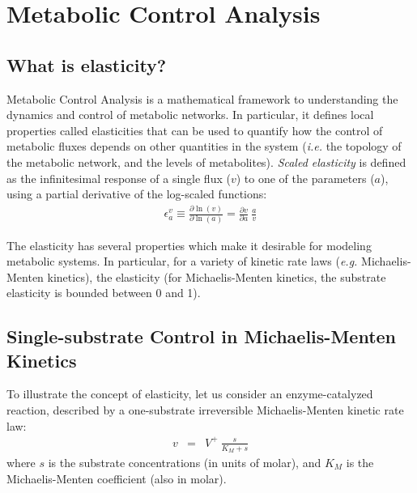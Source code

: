 \documentclass[12pt,a4paper]{article}
\begin{document}
\section{Metabolic Control Analysis}
\subsection{What is elasticity?}
Metabolic Control Analysis \cite{Fell1996-be} is a mathematical framework to understanding the dynamics and control of metabolic networks. In particular, it defines local properties called elasticities that can be used to quantify how the control of metabolic fluxes depends on other quantities in the system (\textit{i.e.} the topology of the metabolic network, and the levels of metabolites). \emph{Scaled elasticity} is defined as the infinitesimal response of a single flux ($v$) to one of the parameters ($a$), using a partial derivative of the log-scaled functions:
\begin{eqnarray}
    \epsilon_a^v \equiv \frac{\partial \ln(v)}{\partial \ln(a)} = \frac{\partial v}{\partial a} ~ \frac{a}{v}
\end{eqnarray}

The elasticity has several properties which make it desirable for modeling metabolic systems. In particular, for a variety of kinetic rate laws (\textit{e.g.} Michaelis-Menten kinetics), the elasticity (for Michaelis-Menten kinetics, the substrate elasticity is bounded between 0 and 1). 

\subsection{Single-substrate Control in Michaelis-Menten Kinetics}
To illustrate the concept of elasticity, let us consider an enzyme-catalyzed reaction, described by a one-substrate irreversible Michaelis-Menten kinetic rate law:
\begin{eqnarray}
    v &=& V^+ ~ \frac{s}{K_M + s}
\end{eqnarray}
where $s$ is the substrate concentrations (in units of molar), and $K_M$ is the Michaelis-Menten coefficient (also in molar).

\begin{center}
\end{center}
\end{document}

